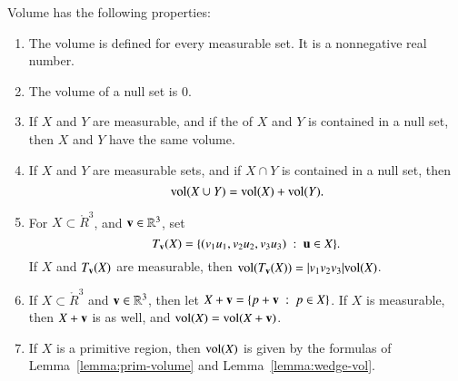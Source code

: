 \begin{lemma}[volume]\label{lemma:volume} 
Volume  has the following properties:
%
\begin{enumerate}%
\item {} The volume is defined for every measurable set.  It is
a nonnegative real number.
\item {} The volume of a null set is $0$.
\item {} If $X$ and $Y$ are  measurable, and if
the  of
$X$ and $Y$ is contained in a null set, then 
$X$ and $Y$ have the same volume.  
\item {} If $X$ and $Y$ are measurable sets, and if $X\cap
Y$ is contained in a null set, then
\[ 
{\operatorname{vol}}(X\cup Y) = {\operatorname{vol}}(X) + {\operatorname{vol}}(Y).
\] 
%
%
\item {} For $X\subset \ring{R}^3$, and
${\mathbf v}\in\mathbb{R}^3$, set
\[ 
T_{\mathbf v}(X) = \{ (v_1u_1,v_2u_2,v_3u_3) \ :\  {\mathbf u}\in X\}.
\] 
%
If $X$ and $T_{\mathbf v}(X)$ are measurable, then
${\operatorname{vol}}(T_{\mathbf v}(X)) = |v_1v_2v_3|{\operatorname{vol}}(X)$.
\item {} If $X\subset \ring{R}^3$ and ${\mathbf v}\in\mathbb{R}^3$,
then let $X+{\mathbf v} = \{p + {\mathbf v}\ :\  p\in X\}$.  If $X$ is measurable,
then $X+{\mathbf v}$ is as well, and ${\operatorname{vol}}(X) = {\operatorname{vol}}(X+{\mathbf v})$.
\item {} If $X$ is a primitive region, then 
 ${\operatorname{vol}}(X)$ is given by the formulas of
Lemma~\ref{lemma:prim-volume} and Lemma~\ref{lemma:wedge-vol}.  
\end{enumerate}
\end{lemma}
%
%
%




